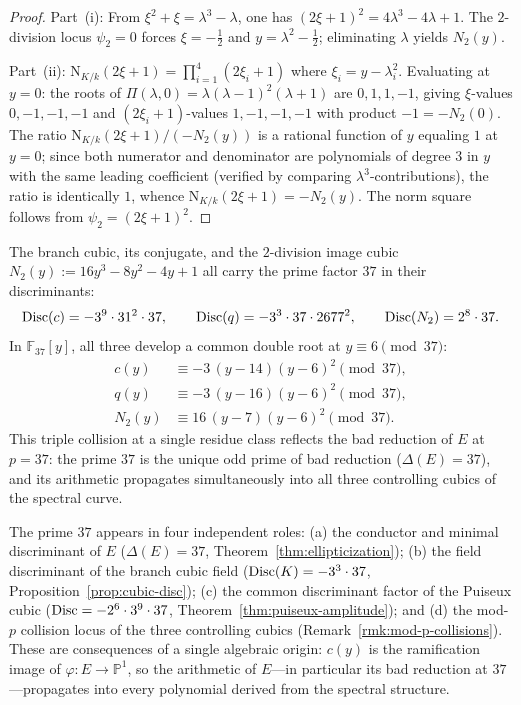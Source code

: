 \begin{proof}
Part~(i): From $\xi^2+\xi=\lambda^3-\lambda$, one has $(2\xi+1)^2=4\lambda^3-4\lambda+1$.
The $2$-division locus $\psi_2=0$ forces $\xi=-\tfrac{1}{2}$ and $y=\lambda^2-\tfrac{1}{2}$; eliminating $\lambda$ yields $N_2(y)$.

Part~(ii): $\mathrm{N}_{K/k}(2\xi+1)=\prod_{i=1}^4(2\xi_i+1)$ where $\xi_i=y-\lambda_i^2$.
Evaluating at $y=0$: the roots of $\Pi(\lambda,0)=\lambda(\lambda-1)^2(\lambda+1)$ are $0,1,1,-1$, giving $\xi$-values $0,-1,-1,-1$ and $(2\xi_i+1)$-values $1,-1,-1,-1$ with product $-1=-N_2(0)$.
The ratio $\mathrm{N}_{K/k}(2\xi+1)/(-N_2(y))$ is a rational function of $y$ equaling $1$ at $y=0$; since both numerator and denominator are polynomials of degree $3$ in $y$ with the same leading coefficient (verified by comparing $\lambda^3$-contributions), the ratio is identically $1$, whence $\mathrm{N}_{K/k}(2\xi+1)=-N_2(y)$.
The norm square follows from $\psi_2=(2\xi+1)^2$.
\end{proof}

\begin{remark}[Mod-$p$ collisions at $p=37$]\label{rmk:mod-p-collisions}
The branch cubic, its conjugate, and the $2$-division image cubic $N_2(y):=16y^3-8y^2-4y+1$ all carry the prime factor $37$ in their discriminants:
\[
\operatorname{Disc}(c)=-3^9\cdot 31^2\cdot 37,\qquad \operatorname{Disc}(q)=-3^3\cdot 37\cdot 2677^2,\qquad \operatorname{Disc}(N_2)=2^8\cdot 37.
\]
In $\mathbb{F}_{37}[y]$, all three develop a common double root at $y\equiv 6\pmod{37}$:
\begin{align*}
c(y)&\equiv -3\,(y-14)(y-6)^2\pmod{37},\\
q(y)&\equiv -3\,(y-16)(y-6)^2\pmod{37},\\
N_2(y)&\equiv 16\,(y-7)(y-6)^2\pmod{37}.
\end{align*}
This triple collision at a single residue class reflects the bad reduction of $E$ at $p=37$: the prime $37$ is the unique odd prime of bad reduction ($\Delta(E)=37$), and its arithmetic propagates simultaneously into all three controlling cubics of the spectral curve.
\end{remark}

\begin{remark}\label{rmk:37-structural}
The prime $37$ appears in four independent roles:
(a) the conductor and minimal discriminant of $E$ ($\Delta(E)=37$, Theorem~\ref{thm:ellipticization});
(b) the field discriminant of the branch cubic field ($\operatorname{Disc}(K)=-3^3\cdot 37$, Proposition~\ref{prop:cubic-disc});
(c) the common discriminant factor of the Puiseux cubic ($\operatorname{Disc}=-2^6\cdot 3^9\cdot 37$, Theorem~\ref{thm:puiseux-amplitude}); and
(d) the mod-$p$ collision locus of the three controlling cubics (Remark~\ref{rmk:mod-p-collisions}).
These are consequences of a single algebraic origin: $c(y)$ is the ramification image of $\varphi:E\to\mathbb{P}^1$, so the arithmetic of $E$---in particular its bad reduction at $37$---propagates into every polynomial derived from the spectral structure.
\end{remark}

